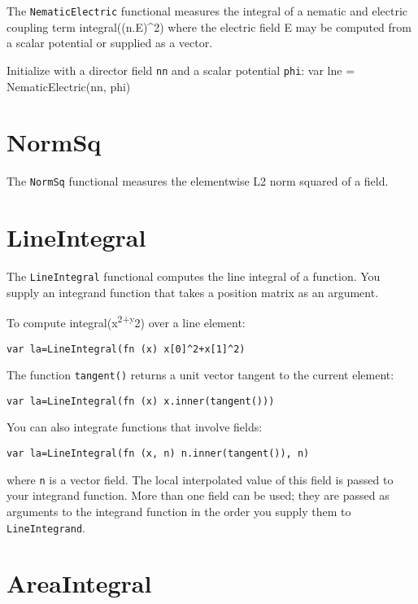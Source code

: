 The \texttt{NematicElectric} functional measures the integral of a
nematic and electric coupling term integral((n.E)\^{}2) where the
electric field E may be computed from a scalar potential or supplied as
a vector.

Initialize with a director field \texttt{nn} and a scalar potential
\texttt{phi}: var lne = NematicElectric(nn, phi)

\hypertarget{normsq}{%
\section{NormSq}\label{normsq}}

The \texttt{NormSq} functional measures the elementwise L2 norm squared
of a field.

\hypertarget{lineintegral}{%
\section{LineIntegral}\label{lineintegral}}

The \texttt{LineIntegral} functional computes the line integral of a
function. You supply an integrand function that takes a position matrix
as an argument.

To compute integral(x\textsuperscript{2+y}2) over a line element:

\begin{lstlisting}
var la=LineIntegral(fn (x) x[0]^2+x[1]^2)
\end{lstlisting}

The function \texttt{tangent()} returns a unit vector tangent to the
current element:

\begin{lstlisting}
var la=LineIntegral(fn (x) x.inner(tangent()))
\end{lstlisting}

You can also integrate functions that involve fields:

\begin{lstlisting}
var la=LineIntegral(fn (x, n) n.inner(tangent()), n)
\end{lstlisting}

where \texttt{n} is a vector field. The local interpolated value of this
field is passed to your integrand function. More than one field can be
used; they are passed as arguments to the integrand function in the
order you supply them to \texttt{LineIntegrand}.

\hypertarget{areaintegral}{%
\section{AreaIntegral}\label{areaintegral}}

